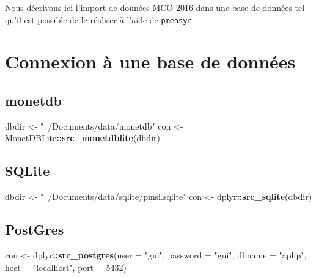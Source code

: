 \documentclass[]{book}
\newenvironment{Shaded}{\begin{snugshade}}{\end{snugshade}}
\newcommand{\DataTypeTok}[1]{\textcolor[rgb]{0.13,0.29,0.53}{#1}}
\newcommand{\DecValTok}[1]{\textcolor[rgb]{0.00,0.00,0.81}{#1}}
\newcommand{\KeywordTok}[1]{\textcolor[rgb]{0.13,0.29,0.53}{\textbf{#1}}}
\newcommand{\NormalTok}[1]{#1}
\newcommand{\OperatorTok}[1]{\textcolor[rgb]{0.81,0.36,0.00}{\textbf{#1}}}
\newcommand{\StringTok}[1]{\textcolor[rgb]{0.31,0.60,0.02}{#1}}
\begin{document}
Nous décrivons ici l'import de données MCO 2016 dans une base de données tel qu'il est possible de le réaliser à l'aide de \texttt{pmeasyr}.

\hypertarget{connexion-a-une-base-de-donnees}{%
\section{Connexion à une base de données}\label{connexion-a-une-base-de-donnees}}

\hypertarget{monetdb}{%
\subsection{monetdb}\label{monetdb}}

\begin{Shaded}
\begin{Highlighting}[]
\NormalTok{dbdir <-}\StringTok{ "~/Documents/data/monetdb"}
\NormalTok{con <-}\StringTok{ }\NormalTok{MonetDBLite}\OperatorTok{::}\KeywordTok{src_monetdblite}\NormalTok{(dbdir)}
\end{Highlighting}
\end{Shaded}

\hypertarget{sqlite}{%
\subsection{SQLite}\label{sqlite}}

\begin{Shaded}
\begin{Highlighting}[]
\NormalTok{dbdir <-}\StringTok{ "~/Documents/data/sqlite/pmsi.sqlite"}
\NormalTok{con <-}\StringTok{ }\NormalTok{dplyr}\OperatorTok{::}\KeywordTok{src_sqlite}\NormalTok{(dbdir)}
\end{Highlighting}
\end{Shaded}

\hypertarget{postgres}{%
\subsection{PostGres}\label{postgres}}

\begin{Shaded}
\begin{Highlighting}[]
\NormalTok{con <-}\StringTok{ }\NormalTok{dplyr}\OperatorTok{::}\KeywordTok{src_postgres}\NormalTok{(}\DataTypeTok{user =} \StringTok{"gui"}\NormalTok{, }\DataTypeTok{password =} \StringTok{"gui"}\NormalTok{, }\DataTypeTok{dbname =} \StringTok{"aphp"}\NormalTok{,}
                    \DataTypeTok{host =} \StringTok{"localhost"}\NormalTok{, }\DataTypeTok{port =} \DecValTok{5432}\NormalTok{)}
\end{Highlighting}
\end{Shaded}
\end{document}
